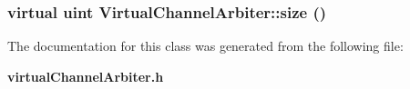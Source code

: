 \subsubsection[{size}]{\setlength{\rightskip}{0pt plus 5cm}virtual {\bf uint} VirtualChannelArbiter::size ()\hspace{0.3cm}{\tt  [pure virtual]}}\label{classVirtualChannelArbiter_f712fea20cab6cb57b5a1ed43fc2d3c8}




The documentation for this class was generated from the following file:\begin{CompactItemize}
\item 
{\bf virtualChannelArbiter.h}\end{CompactItemize}

